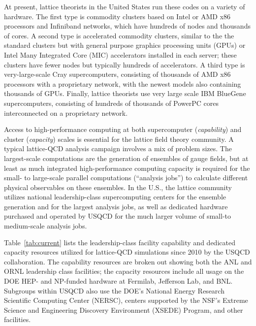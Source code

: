 At present, lattice theorists in the United States run these codes on a
variety of hardware.  The first type is commodity clusters based on Intel or AMD x86
processors and Infiniband networks, which have hundreds of nodes and
thousands of cores.  A second type is accelerated commodity clusters, similar to the the
standard clusters but with general purpose graphics processing units (GPUs) or
Intel Many Integrated Core (MIC) accelerators installed in each server; these
clusters have fewer nodes but typically hundreds of accelerators.  A third type is very-large-scale Cray supercomputers, consisting of thousands of AMD x86 processors
with a proprietary network, with the newest models also containing thousands
of GPUs.  Finally, lattice theorists use very large scale IBM BlueGene supercomputers, consisting of
hundreds of thousands of PowerPC cores interconnected on a proprietary
network.

Access to high-performance computing at both supercomputer ({\em capability})
and cluster ({\em capacity}) scales is essential for the lattice field theory
community.  A typical lattice-QCD analysis campaign involves a mix of problem
sizes.  The largest-scale computations are the generation of ensembles of
gauge fields, but at least as much integrated high-performance computing
capacity is required for the small- to large-scale parallel computations
(``analysis jobs'') to calculate different physical observables on these
ensembles.  In the U.S., the lattice community utilizes national
leadership-class supercomputing centers for the ensemble generation and for
the largest analysis jobs, as well as dedicated hardware purchased and
operated by USQCD for the much larger volume of small-to medium-scale analysis
jobs.

Table~\ref{tab:current} lists the leadership-class facility
capability and dedicated capacity resources utilized
for lattice-QCD simulations since 2010 by the USQCD
collaboration.  The capability resources are broken out showing both the ANL
and ORNL leadership class facilities; the capacity resources include all usage
on the DOE HEP- and NP-funded hardware at
Fermilab, Jefferson Lab, and BNL.  Subgroups within USQCD also use the DOE's
National Energy Research Scientific Computing Center (NERSC), centers
supported by the NSF's Extreme Science and Engineering Discovery Environment
(XSEDE) Program, and other facilities.


